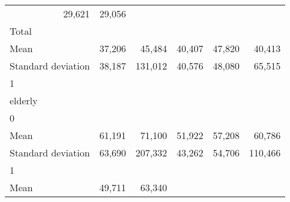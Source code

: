 \begin{tabular}{llllll}
  \multicolumn{1}{r}{29,621} &
  \multicolumn{1}{r}{29,056} \\
\multicolumn{1}{l}{\hspace{3em}Total} &
  \multicolumn{1}{|r}{} &
  \multicolumn{1}{r}{} &
  \multicolumn{1}{r}{} &
  \multicolumn{1}{r}{} &
  \multicolumn{1}{r}{} \\
\multicolumn{1}{l}{\hspace{4em}Mean} &
  \multicolumn{1}{|r}{37,206} &
  \multicolumn{1}{r}{45,484} &
  \multicolumn{1}{r}{40,407} &
  \multicolumn{1}{r}{47,820} &
  \multicolumn{1}{r}{40,413} \\
\multicolumn{1}{l}{\hspace{4em}Standard deviation} &
  \multicolumn{1}{|r}{38,187} &
  \multicolumn{1}{r}{131,012} &
  \multicolumn{1}{r}{40,576} &
  \multicolumn{1}{r}{48,080} &
  \multicolumn{1}{r}{65,515} \\
\multicolumn{1}{l}{\hspace{1em}1} &
  \multicolumn{1}{|r}{} &
  \multicolumn{1}{r}{} &
  \multicolumn{1}{r}{} &
  \multicolumn{1}{r}{} &
  \multicolumn{1}{r}{} \\
\multicolumn{1}{l}{\hspace{2em}elderly} &
  \multicolumn{1}{|r}{} &
  \multicolumn{1}{r}{} &
  \multicolumn{1}{r}{} &
  \multicolumn{1}{r}{} &
  \multicolumn{1}{r}{} \\
\multicolumn{1}{l}{\hspace{3em}0} &
  \multicolumn{1}{|r}{} &
  \multicolumn{1}{r}{} &
  \multicolumn{1}{r}{} &
  \multicolumn{1}{r}{} &
  \multicolumn{1}{r}{} \\
\multicolumn{1}{l}{\hspace{4em}Mean} &
  \multicolumn{1}{|r}{61,191} &
  \multicolumn{1}{r}{71,100} &
  \multicolumn{1}{r}{51,922} &
  \multicolumn{1}{r}{57,208} &
  \multicolumn{1}{r}{60,786} \\
\multicolumn{1}{l}{\hspace{4em}Standard deviation} &
  \multicolumn{1}{|r}{63,690} &
  \multicolumn{1}{r}{207,332} &
  \multicolumn{1}{r}{43,262} &
  \multicolumn{1}{r}{54,706} &
  \multicolumn{1}{r}{110,466} \\
\multicolumn{1}{l}{\hspace{3em}1} &
  \multicolumn{1}{|r}{} &
  \multicolumn{1}{r}{} &
  \multicolumn{1}{r}{} &
  \multicolumn{1}{r}{} &
  \multicolumn{1}{r}{} \\
\multicolumn{1}{l}{\hspace{4em}Mean} &
  \multicolumn{1}{|r}{49,711} &
  \multicolumn{1}{r}{63,340} &

\end{tabular}
